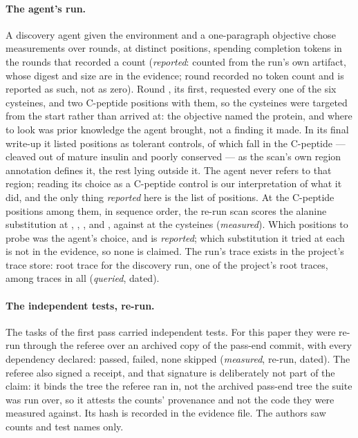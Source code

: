 \documentclass[10pt]{article}
\begin{document}
\paragraph{The agent's run.} A discovery agent given the environment and a one-paragraph objective chose \claimmeas{} measurements over \claimrounds{} rounds, at \claimpositions{} distinct positions, spending \claimtokens{} completion tokens in the rounds that recorded a count (\emph{reported}: counted from the run's own artifact, whose digest and size are in the evidence; \claimnotokens{} round recorded no token count and is reported as such, not as zero). Round \claimcysallround{}, its first, requested every one of the six cysteines, and two C-peptide positions with them, so the cysteines were targeted from the start rather than arrived at: the objective named the protein, and where to look was prior knowledge the agent brought, not a finding it made. In its final write-up it listed \claimctrlnamed{} positions as tolerant controls, of which \claimctrlnamedcpep{} fall in the C-peptide --- cleaved out of mature insulin and poorly conserved --- as the scan's own region annotation defines it, the rest lying outside it. The agent never refers to that region; reading its choice as a C-peptide control is our interpretation of what it did, and the only thing \emph{reported} here is the list of positions. At the C-peptide positions among them, in sequence order, the re-run scan scores the alanine substitution at \claimctrlA{}, \claimctrlD{}, \claimctrlE{}, \claimctrlB{} and \claimctrlC{}, against \claimcysmean{} at the cysteines (\emph{measured}). Which positions to probe was the agent's choice, and is \emph{reported}; which substitution it tried at each is not in the evidence, so none is claimed. The run's trace exists in the project's trace store: \claimtraceroots{} root trace for the discovery run, one of the project's \claimtraceprojroots{} root traces, among \claimtracetotal{} traces in all (\emph{queried}, dated).

\paragraph{The independent tests, re-run.} The \claimunits{} tasks of the first pass carried \claimsealed{} independent tests. For this paper they were re-run through the referee over an archived copy of the pass-end commit, with every dependency declared: \claimsealed{} passed, \claimsealedfail{} failed, none skipped (\emph{measured}, re-run, dated). The referee also signed a receipt, and that signature is deliberately not part of the claim: it binds the tree the referee ran in, not the archived pass-end tree the suite was run over, so it attests the counts' provenance and not the code they were measured against. Its hash is recorded in the evidence file. The authors saw counts and test names only.
\end{document}
